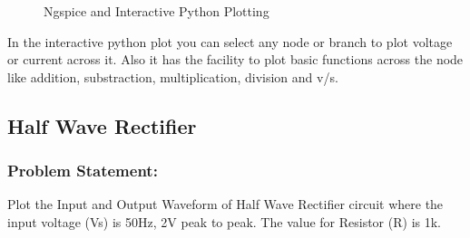 \begin{itemize}
\begin{figure}[!htp]
    \centering
      \hfill
    \caption{Ngspice and Interactive Python Plotting}
\end{figure}

In the interactive python plot you can select any node or branch to  plot voltage or current across it. Also it has the facility to plot basic functions across the node like addition, substraction, multiplication, division and v/s.  

\end{itemize}
\pagebreak

\subsection{Half Wave Rectifier}

\subsubsection{Problem Statement:} Plot the Input and Output Waveform of Half Wave Rectifier circuit where the input voltage (Vs) is 50Hz, 2V peak to peak. The value for Resistor (R) is 1k.

